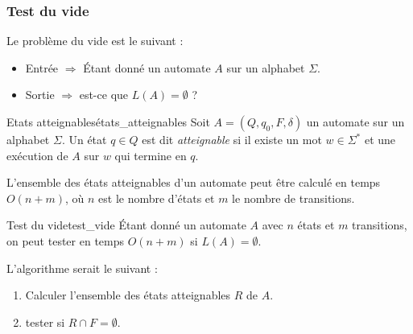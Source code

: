 \subsubsection{Test du vide}
Le problème du vide est le suivant :
\begin{itemize}
    \item Entrée $\Rightarrow$ Étant donné un automate $A$ sur un alphabet $\Sigma$.
    \item Sortie $\Rightarrow$ est-ce que $L(A) = \emptyset$ ?
\end{itemize}
\begin{definition}{Etats atteignables}{états_atteignables}
    Soit $A=(Q, q_0, F, \delta)$ un automate sur un alphabet $\Sigma$. Un état $q\in Q$ est dit \textit{atteignable} si 
    il existe un mot $w\in \Sigma^*$ et une exécution de $A$ sur $w$ qui termine en $q$.
\end{definition}
\begin{remark}
    L'ensemble des états atteignables d'un automate peut être calculé en temps $O(n+m)$, où $n$ est le nombre d'états et
    $m$ le nombre de transitions.
\end{remark}
\begin{theorem}{Test du vide}{test_vide}
    Étant donné un automate $A$ avec $n$ états et $m$ transitions, on peut tester en temps $O(n+m)$ si $L(A) = \emptyset$.
\end{theorem}
L'algorithme serait le suivant :
\begin{enumerate}
    \item Calculer l'ensemble des états atteignables $R$ de $A$.
    \item tester si $R \cap F = \emptyset$.
\end{enumerate}



